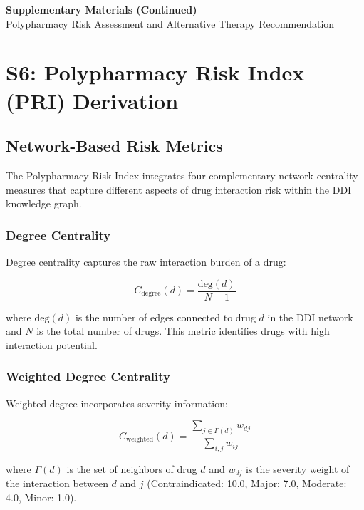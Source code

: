 \documentclass[11pt,a4paper]{article}
\begin{document}
\begin{center}
\Large\textbf{Supplementary Materials (Continued)}\\ [0.5em]
\normalsize Polypharmacy Risk Assessment and Alternative Therapy Recommendation
\end{center}

\section{S6: Polypharmacy Risk Index (PRI) Derivation}

\subsection{Network-Based Risk Metrics}

The Polypharmacy Risk Index integrates four complementary network centrality measures that capture different aspects of drug interaction risk within the DDI knowledge graph.

\subsubsection{Degree Centrality}

Degree centrality captures the raw interaction burden of a drug:

\begin{equation}
C_{\text{degree}}(d) = \frac{\text{deg}(d)}{N - 1}
\end{equation}

where $\text{deg}(d)$ is the number of edges connected to drug $d$ in the DDI network and $N$ is the total number of drugs. This metric identifies drugs with high interaction potential.

\subsubsection{Weighted Degree Centrality}

Weighted degree incorporates severity information:

\begin{equation}
C_{\text{weighted}}(d) = \frac{\sum_{j \in \Gamma(d)} w_{dj}}{\sum_{i,j} w_{ij}}
\end{equation}

where $\Gamma(d)$ is the set of neighbors of drug $d$ and $w_{dj}$ is the severity weight of the interaction between $d$ and $j$ (Contraindicated: 10.0, Major: 7.0, Moderate: 4.0, Minor: 1.0).
\end{document}
